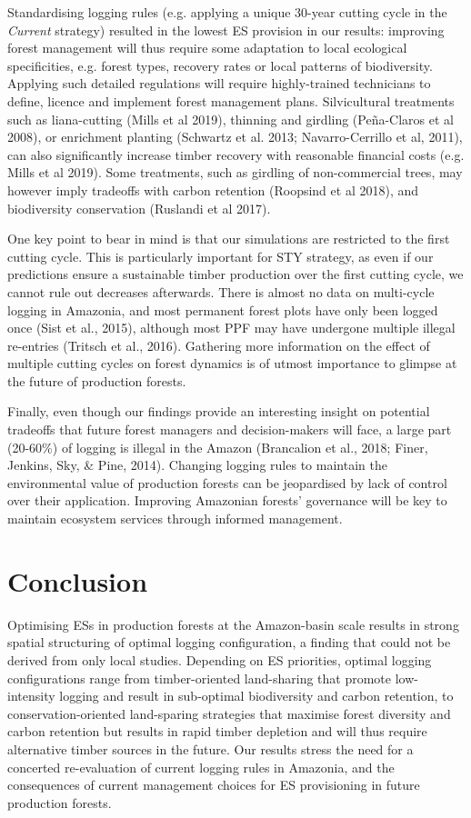 \documentclass{article}
\begin{document}
Standardising logging rules (e.g. applying a unique 30-year cutting cycle in the \textit{Current} strategy) resulted in the lowest ES provision in our results: improving forest management will thus require some adaptation to local ecological specificities, e.g. forest types, recovery rates or local patterns of biodiversity. Applying such detailed regulations will require highly-trained technicians to define, licence and implement forest management plans. Silvicultural treatments such as liana-cutting (Mills et al 2019), thinning and girdling (Peña-Claros et al 2008), or enrichment planting (Schwartz et al. 2013; Navarro-Cerrillo et al, 2011), can also significantly increase timber recovery with reasonable financial costs (e.g. Mills et al 2019). Some treatments, such as  girdling of non-commercial trees, may however imply  tradeoffs with carbon retention (Roopsind et al 2018), and biodiversity conservation (Ruslandi et al 2017). 

One key point to bear in mind is that our simulations are restricted to the first cutting cycle. This is particularly important for STY strategy, as even if our predictions ensure a sustainable timber production over the first cutting cycle, we cannot rule out decreases afterwards. There is almost no data on multi-cycle logging in Amazonia, and most permanent forest plots have only been logged once (Sist et al., 2015), although most PPF may have undergone multiple illegal re-entries (Tritsch et al., 2016). Gathering more information on the effect of multiple  cutting cycles on forest dynamics is of utmost importance to glimpse at the future of production forests.

Finally, even though our findings provide an interesting insight on potential tradeoffs that future forest managers and decision-makers will face, a large part (20-60\%) of logging is illegal in the Amazon (Brancalion et al., 2018; Finer, Jenkins, Sky, & Pine, 2014). Changing logging rules to maintain the environmental value of production forests can be jeopardised by lack of control over their application. Improving Amazonian forests' governance will be key to maintain ecosystem services through informed management. 

\section{Conclusion}
Optimising ESs in production forests at the Amazon-basin scale results in strong spatial structuring of optimal logging configuration, a finding that could not be derived from only local studies. Depending on ES priorities, optimal logging configurations range from timber-oriented land-sharing that promote low-intensity logging and result in sub-optimal biodiversity and carbon retention, to conservation-oriented land-sparing strategies that maximise forest diversity and carbon retention but results in rapid timber depletion and will thus require alternative timber sources in the future. Our results stress the need for a concerted re-evaluation of current logging rules in Amazonia, and the consequences of current management choices for ES provisioning in future production forests.
\end{document}

